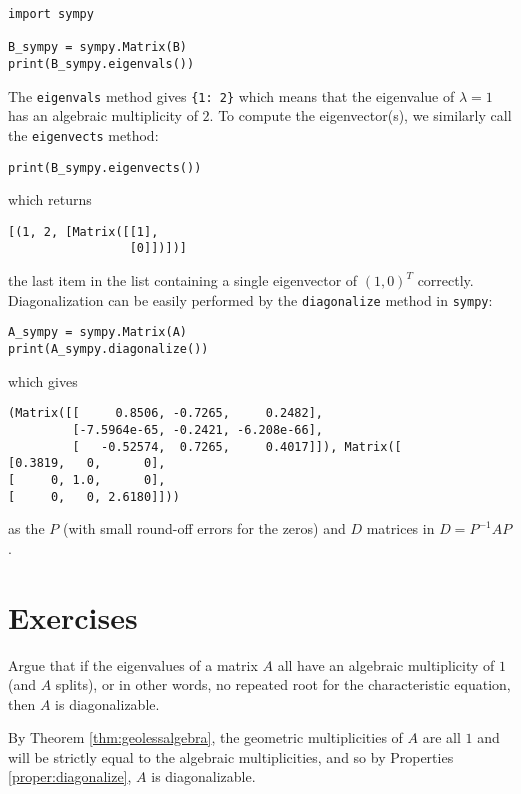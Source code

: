 \begin{lstlisting}
import sympy

B_sympy = sympy.Matrix(B)
print(B_sympy.eigenvals())
\end{lstlisting}
The \verb|eigenvals| method gives \verb|{1: 2}| which means that the eigenvalue of $\lambda = 1$ has an algebraic multiplicity of $2$. To compute the eigenvector(s), we similarly call the \verb|eigenvects| method:
\begin{lstlisting}
print(B_sympy.eigenvects())
\end{lstlisting}
which returns 
\begin{lstlisting}
[(1, 2, [Matrix([[1],
                 [0]])])]
\end{lstlisting}
the last item in the list containing a single eigenvector of $(1,0)^T$ correctly. Diagonalization can be easily performed by the \verb|diagonalize| method in \texttt{sympy}:
\begin{lstlisting}
A_sympy = sympy.Matrix(A)
print(A_sympy.diagonalize())
\end{lstlisting}
which gives
\begin{lstlisting}
(Matrix([[     0.8506, -0.7265,     0.2482],
         [-7.5964e-65, -0.2421, -6.208e-66],
         [   -0.52574,  0.7265,     0.4017]]), Matrix([
[0.3819,   0,      0],
[     0, 1.0,      0],
[     0,   0, 2.6180]]))
\end{lstlisting}
as the $P$ (with small round-off errors for the zeros) and $D$ matrices in $D = P^{-1}AP$.

\section{Exercises}

\begin{Exercise}
Argue that if the eigenvalues of a matrix $A$ all have an algebraic multiplicity of $1$ (and $A$ splits), or in other words, no repeated root for the characteristic equation, then $A$ is diagonalizable. 
\end{Exercise}
\begin{Answer}
By Theorem \ref{thm:geolessalgebra}, the geometric multiplicities of $A$ are all $1$ and will be strictly equal to the algebraic multiplicities, and so by Properties \ref{proper:diagonalize}, $A$ is diagonalizable.
\end{Answer}

